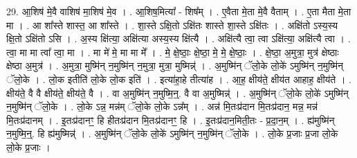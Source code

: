 \documentclass[17pt]{extarticle}
\begin{document}
29. आ॒शिष॑ मे॒वै वाशिष॑ मा॒शिष॑ मे॒व । . आ॒शिष॒मित्या᳚ - शिष᳚म् । . ए॒वैता मे॒ता मे॒वै वैताम् । . ए॒ता मैता मे॒ता मा । . आ शा᳚स्ते शास्त॒ आ शा᳚स्ते । . शा॒स्ते ऽक्षि॒तो ऽक्षि॑तः शास्ते शा॒स्ते ऽक्षि॑तः । . अक्षि॑तो ऽस्य॒स्य क्षि॒तो ऽक्षि॑तो ऽसि । . अ॒स्य क्षि॑त्या॒ अक्षि॑त्या अस्य॒स्य क्षि॑त्यै । . अक्षि॑त्यै त्वा॒ त्वा ऽक्षि॑त्या॒ अक्षि॑त्यै त्वा । . त्वा॒ मा मा त्वा᳚ त्वा॒ मा । . मा मे॑ मे॒ मा मा मे᳚ । . मे॒ क्षे॒ष्ठाः॒ क्षे॒ष्ठा॒ मे॒ मे॒ क्षे॒ष्ठाः॒ । . क्षे॒ष्ठा॒ अ॒मुत्रा॒ मुत्र॑ क्षेष्ठाः क्षेष्ठा अ॒मुत्र॑ । . अ॒मुत्रा॒ मुष्मि॑न् न॒मुष्मि॑न् न॒मुत्रा॒ मुत्रा॒ मुष्मिन्न्॑ । . अ॒मुष्मि॑न् ॅलो॒के लो॒के॑ ऽमुष्मि॑न् न॒मुष्मि॑न् ॅलो॒के । . लो॒क इतीति॑ लो॒के लो॒क इति॑ । . इत्या॑हा॒हे तीत्या॑ह । . आ॒ह॒ क्षीय॑ते॒ क्षीय॑त आहाह॒ क्षीय॑ते । . क्षीय॑ते॒ वै वै क्षीय॑ते॒ क्षीय॑ते॒ वै । . वा अ॒मुष्मि॑न् न॒मुष्मि॒न्॒. वै वा अ॒मुष्मिन्न्॑ । . अ॒मुष्मि॑न् ॅलो॒के लो॒के॑ ऽमुष्मि॑न् न॒मुष्मि॑न् ॅलो॒के । . लो॒के ऽन्न॒ मन्न॑म् ॅलो॒के लो॒के ऽन्न᳚म् । . अन्न॑ मि॒तःप्र॑दान मि॒तःप्र॑दान॒ मन्न॒ मन्न॑ मि॒तःप्र॑दानम् । . इ॒तःप्र॑दानꣳ॒॒ हि हीतःप्र॑दान मि॒तःप्र॑दानꣳ॒॒ हि । . इ॒तःप्र॑दान॒मिती॒तः - प्र॒दा॒न॒म् । . ह्य॑मुष्मि॑न् न॒मुष्मि॒न्॒. हि ह्य॑मुष्मिन्न्॑ । . अ॒मुष्मि॑न् ॅलो॒के लो॒के॑ ऽमुष्मि॑न् न॒मुष्मि॑न् ॅलो॒के । . लो॒के प्र॒जाः प्र॒जा लो॒के लो॒के प्र॒जाः । \newline
\end{document}
